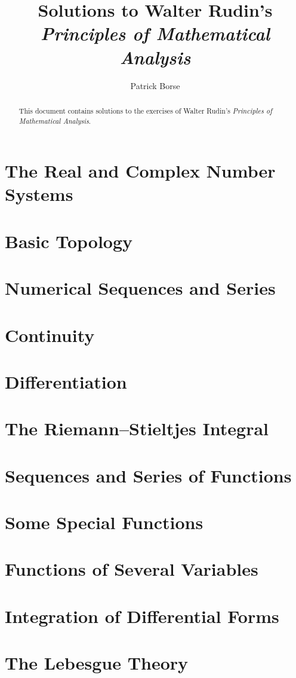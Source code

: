 \documentclass[oneside]{amsbook}
\title{Solutions to Walter Rudin's\\ \emph{Principles of Mathematical Analysis}}
\author{Patrick Borse}
\numberwithin{ex}{chapter}
\begin{document}
\begin{abstract}
This document contains solutions to the exercises of Walter Rudin's \emph{Principles of Mathematical Analysis}. 
\end{abstract}

\maketitle

\tableofcontents

\chapter{The Real and Complex Number Systems}


\chapter{Basic Topology}


\chapter{Numerical Sequences and Series}


\chapter{Continuity}


\chapter{Differentiation}


\chapter{The Riemann--Stieltjes Integral}


\chapter{Sequences and Series of Functions}


\chapter{Some Special Functions}


\chapter{Functions of Several Variables}


\chapter{Integration of Differential Forms}


\chapter{The Lebesgue Theory}

\end{document}

